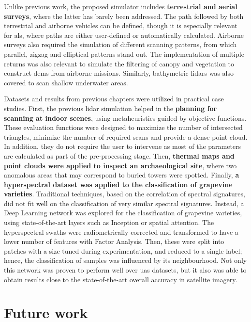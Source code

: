 Unlike previous work, the proposed simulator includes \textbf{terrestrial and aerial surveys}, where the latter has barely been addressed. The path followed by both terrestrial and airborne vehicles can be defined, though it is especially relevant for \acrshort{als}, where paths are either user-defined or automatically calculated. Airborne surveys also required the simulation of different scanning patterns, from which parallel, zigzag and elliptical patterns stand out. The implementation of multiple returns was also relevant to simulate the filtering of canopy and vegetation to construct \acrshort{dem}s from airborne missions. Similarly, bathymetric \acrshort{lidar}s was also covered to scan shallow underwater areas. 

Datasets and results from previous chapters were utilized in practical case studies. First, the previous \acrshort{lidar} simulation helped in the \textbf{planning for scanning at indoor scenes}, using metaheuristics guided by objective functions. These evaluation functions were designed to maximize the number of intersected triangles, minimize the number of required scans and provide a dense point cloud. In addition, they do not require the user to intervene as most of the parameters are calculated as part of the pre-processing stage. Then, \textbf{thermal maps and point clouds were applied to inspect an archaeological site}, where two anomalous areas that may correspond to buried towers were spotted. Finally, \textbf{a hyperspectral dataset was applied to the classification of grapevine varieties}. Traditional techniques, based on the correlation of spectral signatures, did not fit well on the classification of very similar spectral signatures. Instead, a Deep Learning network was explored for the classification of grapevine varieties, using state-of-the-art layers such as Inception or spatial attention. The hyperspectral swaths were radiometrically corrected and transformed to have a lower number of features with Factor Analysis. Then, these were split into patches with a size tuned during experimentation, and reduced to a single label; hence, the classification of samples was influenced by its neighbourhood. Not only this network was proven to perform well over \acrshort{uas} datasets, but it also was able to obtain results close to the state-of-the-art overall accuracy in satellite imagery.  

\section{Future work}

